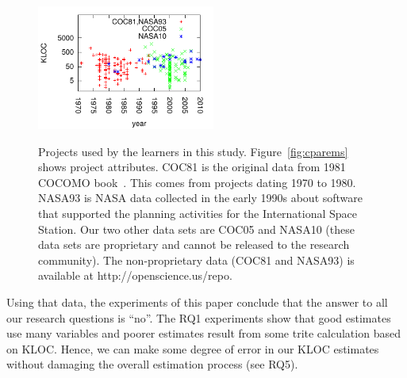 \documentclass{sig-alternate}
\newcommand{\fig}[1]{Figure~\ref{fig:#1}}
\begin{document}
\begin{figure}[!b]
\begin{center}
~\\~\\

\includegraphics[width=2.3in]{yearLOC.pdf}
\noindent
\end{center}
\caption{Projects used by the learners in this study. \fig{cparems}
shows project attributes. 
COC81 is the original data from 1981 COCOMO book~\cite{boehm81}. 
This comes from projects dating 1970 to 1980.
NASA93 is NASA data collected  in the early 1990s
 about software that supported  the planning activities for the International
Space Station. 
Our two other data sets are COC05 and NASA10 (these data sets
are proprietary and 
cannot be released to the research community). 
The non-proprietary data  (COC81 and NASA93) is available at
http://openscience.us/repo.
}\label{fig:types}
\end{figure}

Using that data,  the experiments of this paper conclude that
the answer to all  our  research questions is
``no''.  
The RQ1 experiments show that good estimates use many variables
and  poorer estimates result from   some trite calculation based on KLOC.   
Hence,  we can make some degree of
error in our KLOC estimates without damaging the overall estimation process (see RQ5).
\end{document}
